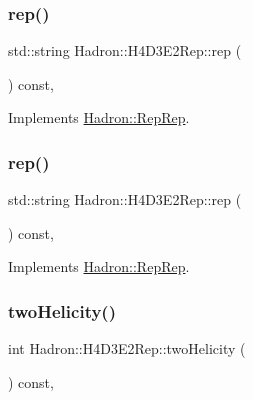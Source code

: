 \subsubsection{\texorpdfstring{rep()}{rep()}\hspace{0.1cm}{\footnotesize\ttfamily [2/3]}}
{\footnotesize\ttfamily std\+::string Hadron\+::\+H4\+D3\+E2\+Rep\+::rep (\begin{DoxyParamCaption}{ }\end{DoxyParamCaption}) const\hspace{0.3cm}{\ttfamily [inline]}, {\ttfamily [virtual]}}



Implements \mbox{\hyperlink{structHadron_1_1RepRep_ab3213025f6de249f7095892109575fde}{Hadron\+::\+Rep\+Rep}}.

\mbox{\label{structHadron_1_1H4D3E2Rep_a11d0a71e415f309565e9ca158248aa60}} 
\subsubsection{\texorpdfstring{rep()}{rep()}\hspace{0.1cm}{\footnotesize\ttfamily [3/3]}}
{\footnotesize\ttfamily std\+::string Hadron\+::\+H4\+D3\+E2\+Rep\+::rep (\begin{DoxyParamCaption}{ }\end{DoxyParamCaption}) const\hspace{0.3cm}{\ttfamily [inline]}, {\ttfamily [virtual]}}



Implements \mbox{\hyperlink{structHadron_1_1RepRep_ab3213025f6de249f7095892109575fde}{Hadron\+::\+Rep\+Rep}}.

\mbox{\label{structHadron_1_1H4D3E2Rep_ad32976f01733eae853ca8ec5fa040b10}} 
\subsubsection{\texorpdfstring{twoHelicity()}{twoHelicity()}\hspace{0.1cm}{\footnotesize\ttfamily [1/2]}}
{\footnotesize\ttfamily int Hadron\+::\+H4\+D3\+E2\+Rep\+::two\+Helicity (\begin{DoxyParamCaption}{ }\end{DoxyParamCaption}) const\hspace{0.3cm}{\ttfamily [inline]}, {\ttfamily [virtual]}}

